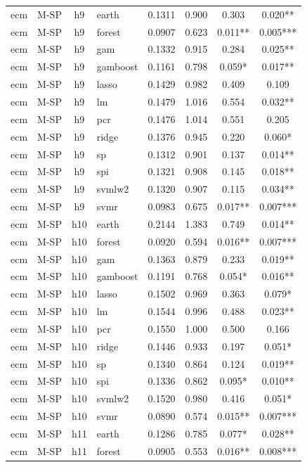 \begin{ThreePartTable}
\begin{longtable}[t]{llclcccc}
\addlinespace
ecm & M-SP & h9 & earth & 0.1311 & 0.900 & 0.303 & 0.020**\\
ecm & M-SP & h9 & forest & 0.0907 & 0.623 & 0.011** & 0.005***\\
ecm & M-SP & h9 & gam & 0.1332 & 0.915 & 0.284 & 0.025**\\
ecm & M-SP & h9 & gamboost & 0.1161 & 0.798 & 0.059* & 0.017**\\
ecm & M-SP & h9 & lasso & 0.1429 & 0.982 & 0.409 & 0.109\\
ecm & M-SP & h9 & lm & 0.1479 & 1.016 & 0.554 & 0.032**\\
ecm & M-SP & h9 & pcr & 0.1476 & 1.014 & 0.551 & 0.205\\
ecm & M-SP & h9 & ridge & 0.1376 & 0.945 & 0.220 & 0.060*\\
ecm & M-SP & h9 & sp & 0.1312 & 0.901 & 0.137 & 0.014**\\
ecm & M-SP & h9 & spi & 0.1321 & 0.908 & 0.145 & 0.018**\\
ecm & M-SP & h9 & svmlw2 & 0.1320 & 0.907 & 0.115 & 0.034**\\
ecm & M-SP & h9 & svmr & 0.0983 & 0.675 & 0.017** & 0.007***\\
\addlinespace
ecm & M-SP & h10 & earth & 0.2144 & 1.383 & 0.749 & 0.014**\\
ecm & M-SP & h10 & forest & 0.0920 & 0.594 & 0.016** & 0.007***\\
ecm & M-SP & h10 & gam & 0.1363 & 0.879 & 0.233 & 0.019**\\
ecm & M-SP & h10 & gamboost & 0.1191 & 0.768 & 0.054* & 0.016**\\
ecm & M-SP & h10 & lasso & 0.1502 & 0.969 & 0.363 & 0.079*\\
ecm & M-SP & h10 & lm & 0.1544 & 0.996 & 0.488 & 0.023**\\
ecm & M-SP & h10 & pcr & 0.1550 & 1.000 & 0.500 & 0.166\\
ecm & M-SP & h10 & ridge & 0.1446 & 0.933 & 0.197 & 0.051*\\
ecm & M-SP & h10 & sp & 0.1340 & 0.864 & 0.124 & 0.019**\\
ecm & M-SP & h10 & spi & 0.1336 & 0.862 & 0.095* & 0.010**\\
ecm & M-SP & h10 & svmlw2 & 0.1520 & 0.980 & 0.416 & 0.051*\\
ecm & M-SP & h10 & svmr & 0.0890 & 0.574 & 0.015** & 0.007***\\
\addlinespace
ecm & M-SP & h11 & earth & 0.1286 & 0.785 & 0.077* & 0.028**\\
ecm & M-SP & h11 & forest & 0.0905 & 0.553 & 0.016** & 0.008***\\

\end{longtable}
\end{ThreePartTable}

